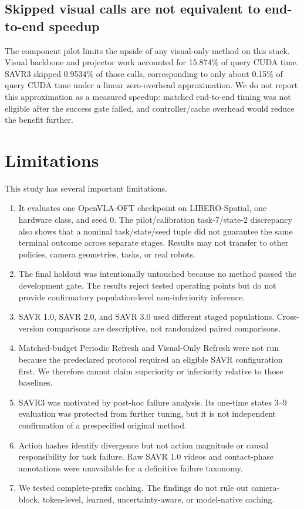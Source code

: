 \documentclass[11pt]{article}
\begin{document}
\subsection{Skipped visual calls are not equivalent to end-to-end speedup}

The component pilot limits the upside of any visual-only method on this stack. Visual backbone and projector work accounted for 15.874\% of query CUDA time. SAVR3 skipped 0.9534\% of those calls, corresponding to only about 0.15\% of query CUDA time under a linear zero-overhead approximation. We do not report this approximation as a measured speedup: matched end-to-end timing was not eligible after the success gate failed, and controller/cache overhead would reduce the benefit further.

\section{Limitations}

This study has several important limitations.

\begin{enumerate}
    \item It evaluates one OpenVLA-OFT checkpoint on LIBERO-Spatial, one hardware class, and seed 0. The pilot/calibration task-7/state-2 discrepancy also shows that a nominal task/state/seed tuple did not guarantee the same terminal outcome across separate stages. Results may not transfer to other policies, camera geometries, tasks, or real robots.
    \item The final holdout was intentionally untouched because no method passed the development gate. The results reject tested operating points but do not provide confirmatory population-level non-inferiority inference.
    \item SAVR 1.0, SAVR 2.0, and SAVR 3.0 used different staged populations. Cross-version comparisons are descriptive, not randomized paired comparisons.
    \item Matched-budget Periodic Refresh and Visual-Only Refresh were not run because the predeclared protocol required an eligible SAVR configuration first. We therefore cannot claim superiority or inferiority relative to those baselines.
    \item SAVR3 was motivated by post-hoc failure analysis. Its one-time states 3--9 evaluation was protected from further tuning, but it is not independent confirmation of a prespecified original method.
    \item Action hashes identify divergence but not action magnitude or causal responsibility for task failure. Raw SAVR 1.0 videos and contact-phase annotations were unavailable for a definitive failure taxonomy.
    \item We tested complete-prefix caching. The findings do not rule out camera-block, token-level, learned, uncertainty-aware, or model-native caching.
\end{enumerate}
\end{document}
